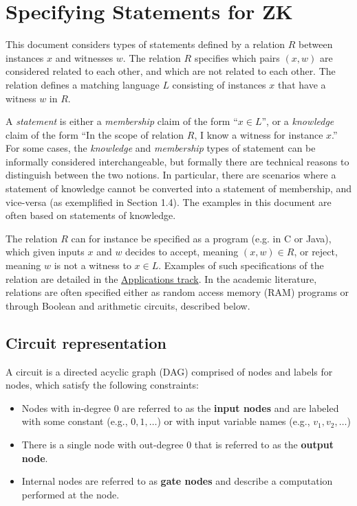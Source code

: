 \section{Specifying Statements for ZK}
\label{security:spec-statements-ZK}

 
	This document considers types of statements defined by a relation $R$ between instances $x$ and witnesses $w$.
	The relation $R$ specifies which pairs $(x,w)$ are considered related to each other, and which are not related to each other.
	The relation defines a matching language $L$ consisting of instances $x$ that have a witness $w$ in $R$.


	
	A \emph{statement} is either a \emph{membership} claim of the form ``$x \in L$'', 
or a \emph{knowledge} claim of the form ``In the scope of relation $R$, I know a witness for instance $x$.''
	For some cases, the \emph{knowledge} and \emph{membership} types of statement can be informally considered interchangeable, but formally there are technical reasons to distinguish between the two notions. 
	In particular, there are scenarios where a statement of knowledge cannot be converted into a statement of membership, and vice-versa (as exemplified in Section 1.4).
	The examples in this document are often based on statements of knowledge.
	\loosen

 
	The relation $R$ can for instance be specified as a program (e.g. in C or Java), which given inputs $x$ and $w$ decides to accept, meaning $(x,w) \in R$, or reject, meaning $w$ is not a witness to $x \in L$. 
	Examples of such specifications of the relation are detailed in the \hyperref[chap:apps]{Applications track}.
	In the academic literature, relations are often specified either as 
random access memory (RAM) programs or through Boolean and arithmetic circuits, described below.



\subsection{Circuit representation}
\label{security:spec-statements-ZK:circuit-representation}


A circuit is a directed acyclic graph (DAG) comprised of nodes and labels for nodes, which satisfy the following constraints:
\begin{itemize}
\item Nodes with in-degree 0 are referred to as the \textbf{input nodes} and are labeled with some constant (e.g., $0, 1, \ldots$) or with input variable names (e.g., $v_1, v_2, \ldots$)
\item There is a single node with out-degree 0 that is referred to as the \textbf{output node}.
\item Internal nodes are referred to as \textbf{gate nodes} and describe a computation performed at the node.\loosen
\end{itemize}


